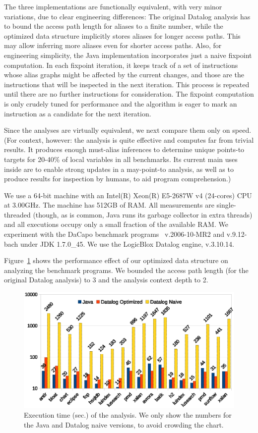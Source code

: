The three implementations are functionally equivalent, with very minor variations, due to clear engineering differences: The original Datalog analysis has to bound the access path length for aliases to a finite number, while the optimized data structure implicitly stores aliases for longer access paths. This may allow inferring more aliases even for shorter access paths. Also, for engineering simplicity, the Java implementation incorporates just a naive fixpoint computation. In each fixpoint iteration, it keeps track of a set of instructions whose alias graphs might be affected by the current changes, and those are the instructions that will be inspected in the next iteration. This process is repeated until there are no further instructions for consideration. The fixpoint computation is only crudely tuned for performance and the algorithm is eager to mark an instruction as a candidate for the next iteration.

Since the analyses are virtually equivalent, we next compare them only on speed. (For context, however: the analysis is quite effective and computes far from trivial results. It produces enough must-alias inferences to determine unique points-to targets for 20-40\% of local variables in all benchmarks. Its current main uses inside \doop{} are to enable strong updates in a may-point-to analysis, as well as to produce results for inspection by humans, to aid program comprehension.)

We use a 64-bit machine with an Intel(R) Xeon(R) E5-2687W v4 (24-cores) CPU at 3.00GHz. The machine has 512GB of RAM. All measurements are single-threaded (though, as is common, Java runs its garbage collector in extra threads) and all executions occupy only a small fraction of the available RAM. We experiment with the DaCapo benchmark programs~\cite{oopsla:2006:Blackburn} v.2006-10-MR2 and v.9.12-bach under JDK 1.7.0\_45.  We use the LogicBlox Datalog engine, v.3.10.14.


Figure~\ref{fig:must-data:time-chart} shows the performance effect of our optimized data structure on analyzing the benchmark programs. We bounded the access path length (for the original Datalog analysis) to 3 and the analysis context depth to 2.

\begin{figure}[htp]
\centering
\includegraphics[clip,width=0.77\linewidth, height=0.4275\linewidth]{assets/must-data/time.eps}
\caption[Execution times for the Java and both Datalog versions]{Execution time (sec.) of the analysis. We only show the numbers for the Java and Datalog naive versions, to avoid crowding the chart.}
\label{fig:must-data:time-chart}
\end{figure}


